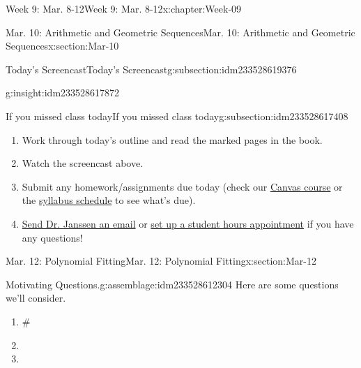\documentclass[oneside,10pt,]{book}
\numberwithin{equation}{section}
\newlength{\previewwidth}
\begin{document}
\begin{chapterptx}{Week 9: Mar. 8-12}{}{Week 9: Mar. 8-12}{}{}{x:chapter:Week-09}
\begin{sectionptx}{Mar. 10: Arithmetic and Geometric Sequences}{}{Mar. 10: Arithmetic and Geometric Sequences}{}{}{x:section:Mar-10}
\begin{subsectionptx}{Today's Screencast}{}{Today's Screencast}{}{}{g:subsection:idm233528619376}
\begin{insight}{}{g:insight:idm233528617872}
\begin{tcbraster}[raster columns=2, raster column skip=1pt, raster halign=center, raster force size=false, raster left skip=0pt, raster right skip=0pt]
\begin{tcolorbox}[previewstyle, width=\previewwidth]
\end{tcolorbox}%
\begin{tcolorbox}[qrstyle]%
[QR LINK]\end{tcolorbox}%
\end{tcbraster}%
\end{insight}
\end{subsectionptx}
%
%
\typeout{************************************************}
\typeout{************************************************}
%
\begin{subsectionptx}{If you missed class today}{}{If you missed class today}{}{}{g:subsection:idm233528617408}
%
\begin{enumerate}
\item{}Work through today's outline and read the marked pages in the book.%
\item{}Watch the screencast above.%
\item{}Submit any homework\slash{}assignments due today (check our \href{https://dordt.instructure.com/courses/3110050}{Canvas course} or the \href{https://prof.mkjanssen.org/ds/index.html\#schedule}{syllabus schedule} to see what's due).%
\item{}\href{mailto:mike.janssen@dordt.edu}{Send Dr. Janssen an email} or \href{https://calendly.com/mkjanssen/student-hours}{set up a student hours appointment} if you have any questions!%
\end{enumerate}
\end{subsectionptx}
\end{sectionptx}
%
%
\typeout{************************************************}
\typeout{************************************************}
%
\begin{sectionptx}{Mar. 12: Polynomial Fitting}{}{Mar. 12: Polynomial Fitting}{}{}{x:section:Mar-12}
\begin{introduction}{}%
\begin{assemblage}{Motivating Questions.}{g:assemblage:idm233528612304}%
Here are some questions we'll consider. %
\begin{enumerate}
\item{}\#%
\item{}%
\item{}%
\end{enumerate}
%
\end{assemblage}
\end{introduction}%
%
%
\typeout{************************************************}

\end{sectionptx}
\end{chapterptx}
\end{document}
